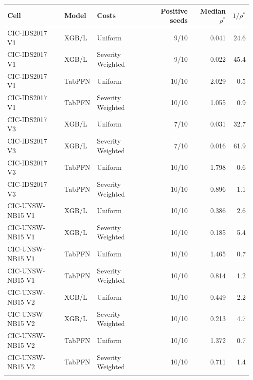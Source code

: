 \begin{tabular}{@{}lllrrr@{}}
\toprule
Cell & Model & Costs & Positive seeds & Median $\rho^*$ & $1/\rho^*$ \\
\midrule
CIC-IDS2017 V1 & XGB/L & Uniform & 9/10 & 0.041 & 24.6 \\
CIC-IDS2017 V1 & XGB/L & Severity Weighted & 9/10 & 0.022 & 45.4 \\
CIC-IDS2017 V1 & TabPFN & Uniform & 10/10 & 2.029 & 0.5 \\
CIC-IDS2017 V1 & TabPFN & Severity Weighted & 10/10 & 1.055 & 0.9 \\
\addlinespace
CIC-IDS2017 V3 & XGB/L & Uniform & 7/10 & 0.031 & 32.7 \\
CIC-IDS2017 V3 & XGB/L & Severity Weighted & 7/10 & 0.016 & 61.9 \\
CIC-IDS2017 V3 & TabPFN & Uniform & 10/10 & 1.798 & 0.6 \\
CIC-IDS2017 V3 & TabPFN & Severity Weighted & 10/10 & 0.896 & 1.1 \\
\addlinespace
CIC-UNSW-NB15 V1 & XGB/L & Uniform & 10/10 & 0.386 & 2.6 \\
CIC-UNSW-NB15 V1 & XGB/L & Severity Weighted & 10/10 & 0.185 & 5.4 \\
CIC-UNSW-NB15 V1 & TabPFN & Uniform & 10/10 & 1.465 & 0.7 \\
CIC-UNSW-NB15 V1 & TabPFN & Severity Weighted & 10/10 & 0.814 & 1.2 \\
\addlinespace
CIC-UNSW-NB15 V2 & XGB/L & Uniform & 10/10 & 0.449 & 2.2 \\
CIC-UNSW-NB15 V2 & XGB/L & Severity Weighted & 10/10 & 0.213 & 4.7 \\
CIC-UNSW-NB15 V2 & TabPFN & Uniform & 10/10 & 1.372 & 0.7 \\
CIC-UNSW-NB15 V2 & TabPFN & Severity Weighted & 10/10 & 0.711 & 1.4 \\
\addlinespace
\bottomrule
\end{tabular}